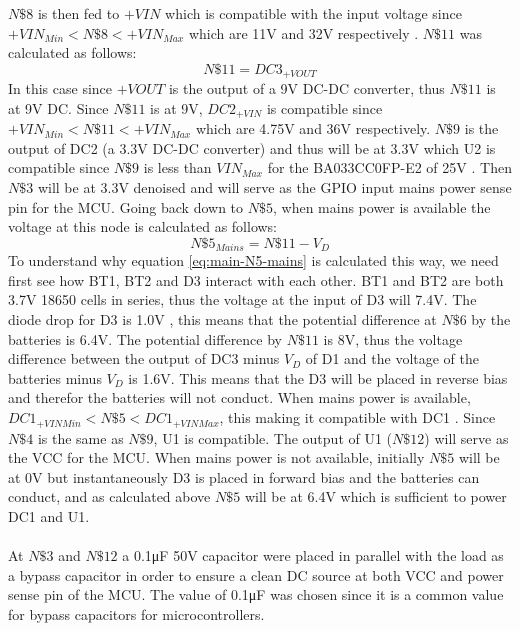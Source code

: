 $N\$8$ is then fed to $+VIN$ which is compatible with the input voltage since $+VIN_{Min} < N\$8 < +VIN_{Max}$ which are 11\si{\V} and 32\si{\V} respectively \cite{R78W900}.
$N\$11$ was calculated as follows:
\begin{equation}
  N\$11 = DC3_{+VOUT}
  \label{eq:main-N11}
\end{equation}
In this case since $+VOUT$ is the output of a 9\si{\V} DC-DC converter, thus $N\$11$ is at 9\si{V} DC. Since $N\$11$ is at 9\si{V}, $DC2_{+VIN}$ is compatible since $+VIN_{Min} < N\$11 < +VIN_{Max}$ which are 4.75\si{\V} and 36\si{\V} respectively. $N\$9$ is the output of DC2 (a 3.3\si{\V} DC-DC converter) and thus will be at 3.3\si{\V} which U2 is compatible since $N\$9$ is less than $VIN_{Max}$ for the BA033CC0FP-E2 of 25\si{\V} \cite{BA033CC0FPE2}. Then $N\$3$ will be at 3.3\si{\V} denoised and will serve as the GPIO input mains power sense pin for the MCU.
Going back down to $N\$5$, when mains power is available the voltage at this node is calculated as follows:
\begin{equation}
  N\$5_{Mains} = N\$11 - V_{D}
  \label{eq:main-N5-mains}
\end{equation}
To understand why equation \ref{eq:main-N5-mains} is calculated this way, we need first see how BT1, BT2 and D3 interact with each other. BT1 and BT2 are both 3.7\si{\V} 18650 cells \cite{ICR186502200F} in series, thus the voltage at the input of D3 will 7.4\si{\V}. The diode drop for D3 is 1.0\si{\V} \cite{1N4004}, this means that the potential difference at $N\$6$ by the batteries is 6.4\si{\V}. The potential difference by $N\$11$ is 8\si{\V}, thus the voltage difference between the output of DC3 minus $V_{D}$ of D1 and the voltage of the batteries minus $V_{D}$ is 1.6\si{\V}. This means that the D3 will be placed in reverse bias and therefor the batteries will not conduct. When mains power is available, $DC1_{+VINMin} < N\$5 < DC1_{+VINMax}$, this making it compatible with DC1 \cite{K7803500R3}. Since $N\$4$ is the same as $N\$9$, U1 is compatible. The output of U1 ($N\$12$) will serve as the VCC for the MCU.
When mains power is not available, initially $N\$5$ will be at 0\si{\V} but instantaneously D3 is placed in forward bias and the batteries can conduct, and as calculated above $N\$5$ will be at 6.4\si{\V} which is sufficient to power DC1 and U1.\\\\
At $N\$3$ and $N\$12$ a 0.1\si{\micro\farad} 50\si{\V} capacitor were placed in parallel with the load as a bypass capacitor in order to ensure a clean DC source at both VCC and power sense pin of the MCU. The value of 0.1\si{\micro\farad} was chosen since it is a common value for bypass capacitors for microcontrollers.\\
